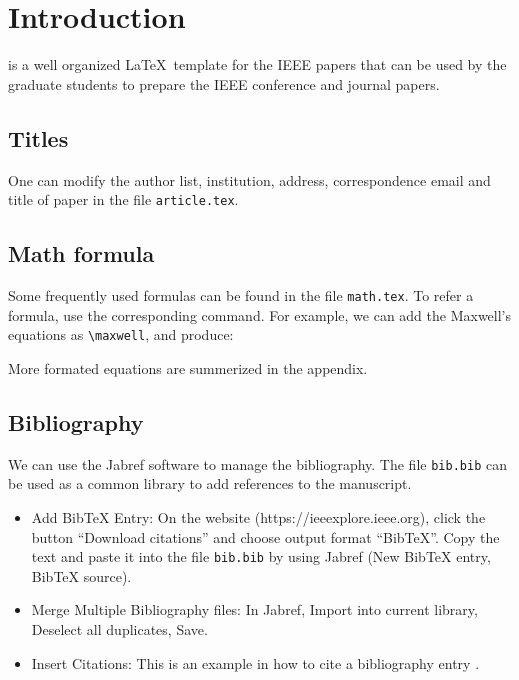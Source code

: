 

\section{Introduction}
\label{sec:introduction}


 is a well organized \LaTeX ~template for the IEEE papers that can be used by  the graduate students to prepare the IEEE conference and journal papers.



\subsection{Titles}

One can modify the author list, institution, address, correspondence email and title of paper in the file \verb+article.tex+.



\subsection{Math formula}

Some frequently used formulas can be found in the file \verb+math.tex+.
To refer a formula, use the corresponding command.
For example, we can add the Maxwell's equations as \verb+\maxwell+, and produce:

\maxwell

More formated equations are summerized  in the appendix.



\subsection{Bibliography}

We can use the Jabref software to manage the bibliography.
The file \verb+bib.bib+ can be used as a common library to add references to the manuscript.

\begin{itemize}
  \item Add BibTeX Entry: On the website (https://ieeexplore.ieee.org), click the button ``Download citations'' and choose output format ``BibTeX''. Copy the text and paste it into the file \verb+bib.bib+ by using Jabref (New BibTeX entry, BibTeX source).
  \item Merge Multiple Bibliography files: In Jabref, Import into current library, Deselect all duplicates, Save.
  \item Insert Citations: This is an example in how to cite a bibliography entry \cite{cao2018, cui2019}.
\end{itemize}

